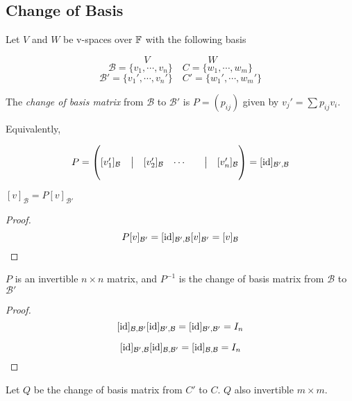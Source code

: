 \documentclass[a4paper]{article}
\begin{document}
\subsection{Change of Basis}

Let $ V $ and $ W $ be v-spaces over $ \mathbb{F} $ with the following basis


\[ V \qquad \qquad \qquad  W  \]
\[ \mathcal{B} = \{ v_{1},\cdots,v_{n} \} \quad C = \{ w_{1},\cdots,w_{m} \} \]
\[ \mathcal{B}' = \{ v_{1}',\cdots,v_{n}' \} \quad C' = \{ w_{1}',\cdots,w_{m}' \} \]

\begin{defi}
	The \emph{change of basis matrix} from $ \mathcal{B} $ to $ \mathcal{B}' $ is $ P = (p_{ij}) $ given by $ v_{j}' = \sum p_{ij}v_{i} $.
	
	Equivalently,
	
	\[ P = \begin{pmatrix}
	& & & & & & \\
	[v_{1}']_{\mathcal{B}} & \big| & [v_{2}']_{\mathcal{B}} & \cdots &  & \big| & [v_{n}']_{\mathcal{B}} \\
	& & & & & &
	\end{pmatrix} = [\operatorname{id}]_{\mathcal{B}',\mathcal{B}}  \]	
	
\end{defi}

\begin{lemma} 
	$ [v]_{\mathcal{B}} = P [v]_{\mathcal{B}'} $
\end{lemma}

\begin{proof}
	\[ P [v]_{\mathcal{B}'} = [\operatorname{id}]_{\mathcal{B}',\mathcal{B}}[v]_{\mathcal{B}'} = [v]_{\mathcal{B}} \] 
\end{proof}

\begin{lemma} 
	$ P $ is an invertible $ n \times n $ matrix, and $ P^{-1} $ is the change of basis matrix from $ \mathcal{B} $ to $ \mathcal{B}' $
\end{lemma}

\begin{proof}
	\[  [\operatorname{id}]_{\mathcal{B},\mathcal{B}'} [\operatorname{id}]_{\mathcal{B}',\mathcal{B}} =  [\operatorname{id}]_{\mathcal{B}',\mathcal{B}'}  = I_{n}\]
	
		\[  [\operatorname{id}]_{\mathcal{B'},\mathcal{B}} [\operatorname{id}]_{\mathcal{B},\mathcal{B}'} =  [\operatorname{id}]_{\mathcal{B},\mathcal{B}}  = I_{n}\]
	
\end{proof}

Let $ Q $ be the change of basis matrix from $ C' $ to $ C $. $ Q $ also invertible $ m \times m $.
\end{document}
